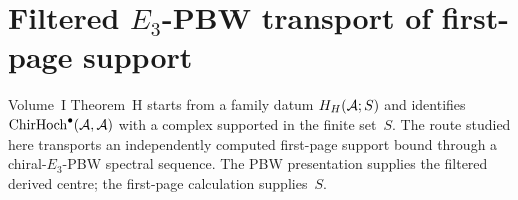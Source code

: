 \section{Filtered $E_3$-PBW transport of first-page support}
\label{sec:chd-rigidity}

Volume~I Theorem~H starts from a family datum $H_H(\mathcal{A};S)$ and
identifies $\mathrm{ChirHoch}^\bullet(\mathcal{A},\mathcal{A})$ with a complex supported in the
finite set~$S$. The route studied here transports an independently
computed first-page support bound through a chiral-$E_3$-PBW spectral
sequence. The PBW presentation supplies the filtered derived centre;
the first-page calculation supplies~$S$.

